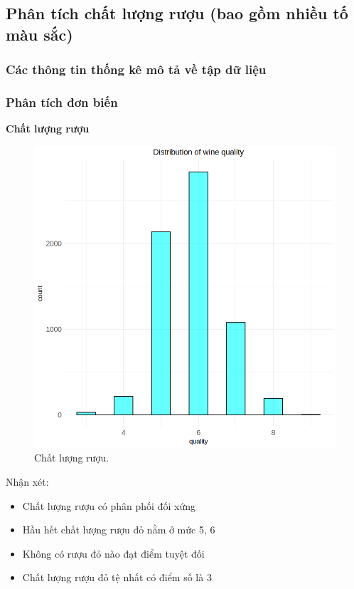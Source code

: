 \subsection{Phân tích chất lượng rượu (bao gồm nhiều tố màu sắc)}


\subsubsection{Các thông tin thống kê mô tả về tập dữ liệu}


\subsubsection{Phân tích đơn biến}

\textbf{Chất lượng rượu}
\begin{figure}[H]
    \centering
    \includegraphics[width=0.75\columnwidth]{wine_colors/wine_quality.png}
    \caption{Chất lượng rượu.}
    \label{fig:wine_quality}
\end{figure}
Nhận xét:
\begin{itemize}
    \item Chất lượng rượu có phân phối đối xứng 
    \item Hầu hết chất lượng rượu đỏ nằm ở mức 5, 6
    \item Không có rượu đỏ nào đạt điểm tuyệt đối
    \item Chất lượng rượu đỏ tệ nhất có điểm số là 3
\end{itemize}

